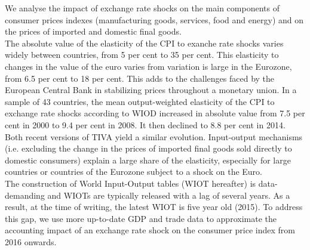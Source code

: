 \documentclass[11pt,a4paper]{article}
\begin{document}
We analyse the impact of exchange rate shocks on the main components of consumer prices indexes (manufacturing goods, services, food and energy) and on the prices of imported and domestic final goods. \\
The absolute value of the elasticity of the CPI to exanche rate shocks varies widely between countries, from 5 per cent to 35 per cent. This elasticity to changes in the value of the euro varies from variation is large in the Eurozone, from 6.5 per cent to 18 per cent. This adds to the challenges faced by the European Central Bank in stabilizing prices throughout a monetary union. In a sample of 43 countries, the mean output-weighted elasticity of the CPI to exchange rate shocks according to WIOD increased in absolute value from 7.5 per cent in 2000 to 9.4 per cent in 2008.
It then declined to 8.8 per cent in 2014.
Both recent versions of TIVA yield a similar evolution.
Input-output mechanisms (i.e. excluding the change in the prices of imported final goods sold directly to domestic consumers) explain a large share of the elasticity, especially for large countries or countries of the Eurozone subject to a shock on the Euro.\\
The construction of World Input-Output tables (WIOT hereafter) is data-demanding and WIOTs are typically released with a lag of several years.
As a result, at the time of writing, the latest WIOT is five year old (2015).
To address this gap, we use more up-to-date GDP and trade data to approximate the accounting impact of an exchange rate shock on the consumer price index from 2016 onwards.

\end{document}
